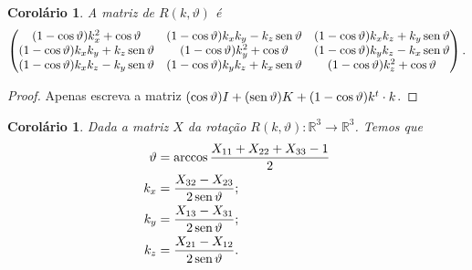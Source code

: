 \documentclass[12pt]{amsart}
\newcommand{\R}{\mathbb R}
\DeclareMathOperator{\sen}{\textrm{\rm sen}}
\newtheorem{corollary}[theorem]{Corolário}
\theoremstyle{definition}
\begin{document}
\begin{corollary}
    A matriz de $R(k,\vartheta)$ é 
    \[
        \begin{pmatrix}
            (1-\cos\vartheta)k_x^2+\cos\vartheta & (1-\cos\vartheta)k_xk_y-k_z\sen\vartheta  & 
            (1-\cos\vartheta)k_xk_z+k_y\sen\vartheta \\
            (1-\cos\vartheta)k_xk_y+k_z\sen\vartheta  & (1-\cos\vartheta)k_y^2+\cos\vartheta  & 
            (1-\cos\vartheta)k_yk_z-k_x\sen\vartheta \\
            (1-\cos\vartheta)k_xk_z-k_y\sen\vartheta & (1-\cos\vartheta)k_yk_z+k_x\sen\vartheta  & 
            (1-\cos\vartheta)k_z^2+\cos\vartheta
        \end{pmatrix}.
    \]
\end{corollary}
\begin{proof} Apenas escreva a matriz $(\cos\vartheta) I+(\sen\vartheta) K+(1-\cos\vartheta)k^t\cdot k$.
\end{proof}

\begin{corollary}
    Dada a matriz $X$ da rotação $R(k,\vartheta):\R^3\to\R^3$. Temos que
    \begin{align*}
        \vartheta&=\arccos\frac{X_{11}+X_{22}+X_{33}-1}2\\
        k_x&=\frac{X_{32}-X_{23}}{2\sen\vartheta};\\
        k_y&=\frac{X_{13}-X_{31}}{2\sen\vartheta};\\
        k_z&=\frac{X_{21}-X_{12}}{2\sen\vartheta}.
    \end{align*}
\end{corollary}
\end{document}
